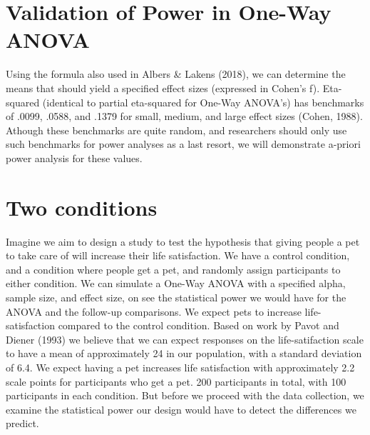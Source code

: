 \documentclass[]{book}
\begin{document}
\hypertarget{validation-of-power-in-one-way-anova}{%
\section{Validation of Power in One-Way ANOVA}\label{validation-of-power-in-one-way-anova}}

Using the formula also used in Albers \& Lakens (2018), we can determine the means that should yield a specified effect sizes (expressed in Cohen's f). Eta-squared (identical to partial eta-squared for One-Way ANOVA's) has benchmarks of .0099, .0588, and .1379 for small, medium, and large effect sizes (Cohen, 1988). Athough these benchmarks are quite random, and researchers should only use such benchmarks for power analyses as a last resort, we will demonstrate a-priori power analysis for these values.

\hypertarget{two-conditions}{%
\section{Two conditions}\label{two-conditions}}

Imagine we aim to design a study to test the hypothesis that giving people a pet to take care of will increase their life satisfaction. We have a control condition, and a condition where people get a pet, and randomly assign participants to either condition. We can simulate a One-Way ANOVA with a specified alpha, sample size, and effect size, on see the statistical power we would have for the ANOVA and the follow-up comparisons. We expect pets to increase life-satisfaction compared to the control condition. Based on work by Pavot and Diener (1993) we believe that we can expect responses on the life-satifaction scale to have a mean of approximately 24 in our population, with a standard deviation of 6.4. We expect having a pet increases life satisfaction with approximately 2.2 scale points for participants who get a pet. 200 participants in total, with 100 participants in each condition. But before we proceed with the data collection, we examine the statistical power our design would have to detect the differences we predict.
\end{document}
